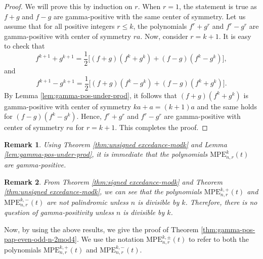 \documentclass[12pt]{article}
\newcommand{\MPE}{\mathrm{MPE}}
\newtheorem{remark}{\bf Remark}[section]
\begin{document}
\begin{proof}
We will prove this by induction on $r$. When $r=1$, the statement is true as $f+g$ and $f-g$ are gamma-positive with the same center of symmetry. Let us assume that for all positive integers $r \leq k$, the polynomials $f^r+g^r$ and $f^r-g^r$ are gamma-positive with center of symmetry $ra$. Now, consider $r=k+1$. It is easy to check that 
\[f^{k+1}+g^{k+1}= \frac{1}{2} \big[ (f+g)(f^{k}+g^{k})+ (f-g)(f^{k}-g^{k}) \big] ,\]
and 
\[f^{k+1}-g^{k+1}= \frac{1}{2} \big[ (f+g)(f^{k}-g^{k})+ (f-g)(f^{k}+g^{k}) \big] .\]
By Lemma \ref{lem:gamma-pos-under-prod}, it follows that $(f+g)(f^k+g^k)$ is gamma-positive with center of symmetry $ka+a=(k+1)a$ and the same holds for $(f-g)(f^k-g^k).$ Hence, $f^r+g^r$ and $f^r-g^r$ are gamma-positive with center of symmetry $ra$ for $r=k+1$. This completes the proof. 
\end{proof}

\begin{remark}
\label{rem:gamma-pos}
Using Theorem \ref{thm:unsigned excedance-modk} and Lemma 
\ref{lem:gamma-pos-under-prod}, it is immediate that the polynomials $\MPE_{n,r}^k(t)$ are gamma-positive. 
\end{remark}

\begin{remark}
\label{rem:not-gamma-pos}
From Theorem \ref{thm:signed excedance-modk} and Theorem \ref{thm:unsigned excedance-modk}, we can see that the polynomials 
$\MPE_{n,r}^{k,+}(t)$ and $\MPE_{n,r}^{k,-}(t)$ are not  palindromic unless $n$ is divisible by $k$. Therefore, there is no question of gamma-positivity unless $n$ is divisible by $k$. 
\end{remark}

Now, by using the above results, we give the proof of Theorem \ref{thm:gamma-pos-pap-even-odd-n-2mod4}.
We use the notation $\MPE_{n,r}^{k,\pm}(t)$ to refer to both
the polynomials 
$\MPE_{n,r}^{k,+}(t)$ and $\MPE_{n,r}^{k,-}(t)$.
\end{document}
